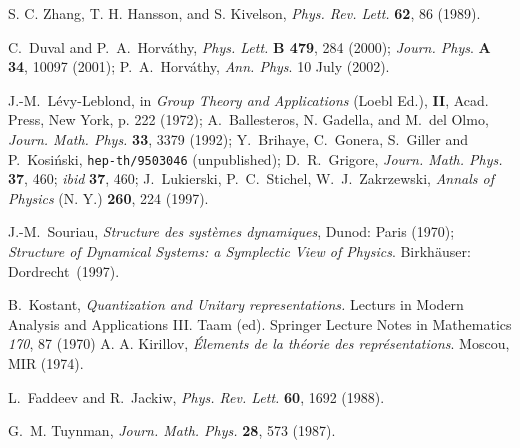 \documentclass[a4paper,12pt]{article}
\begin{document}
\begin{thebibliography}{0}
S. C. Zhang, T. H. Hansson, and S. Kivelson,
{\it Phys. Rev. Lett.} {\bf 62}, 86 (1989).

C.~Duval and P.~A.~Horv\'athy,
{\it Phys. Lett.} {\bf B 479}, 284 (2000);
{\it Journ. Phys}. {\bf A 34}, 10097 (2001); 
 P.~A.~Horv\'athy, {\it Ann. Phys}. 10 July (2002).

J.-M.~L\'evy-Leblond,
in {\it Group Theory and Applications} (Loebl Ed.),
{\bf II}, Acad. Press, New York, p. 222 (1972);
A.~Ballesteros, N. Gadella, and M.~del Olmo,
 {\it Journ. Math. Phys.} {\bf 33}, 3379 (1992);
Y.~Brihaye, C.~Gonera, S.~Giller and P.~Kosi\'nski,
\texttt {hep-th/9503046} (unpublished);
D.~R.~Grigore,
 {\it Journ. Math. Phys.} {\bf 37}, 460;
{\it ibid} {\bf 37}, 460;
J.~Lukierski, P.~C.~Stichel, W.~J.~Zakrzewski,
{\it Annals of Physics}  (N. Y.) {\bf 260}, 224 (1997).

J.-M.~Souriau,
{\it Structure des syst\`emes dynamiques},
Dunod: Paris (1970);
{\it Structure of Dynamical Systems: a Symplectic View of Physics}.
Birkh\"auser: Dordrecht~(1997).

B.~Kostant, {\it Quantization and Unitary representations.}
Lecturs in Modern Analysis and Applications III. Taam (ed).
Springer Lecture Notes in Mathematics {\it 170}, 87 (1970)
A. A. Kirillov, {\it\'Elements de la th\'eorie des repr\'esentations}.
Moscou, MIR (1974). 

L.~Faddeev and R.~Jackiw,
{\it Phys. Rev. Lett.} {\bf 60}, 1692 (1988). 

 G.~M. Tuynman,
{\it Journ. Math. Phys.} {\bf 28}, 573 (1987).

\end{thebibliography}
\end{document}
